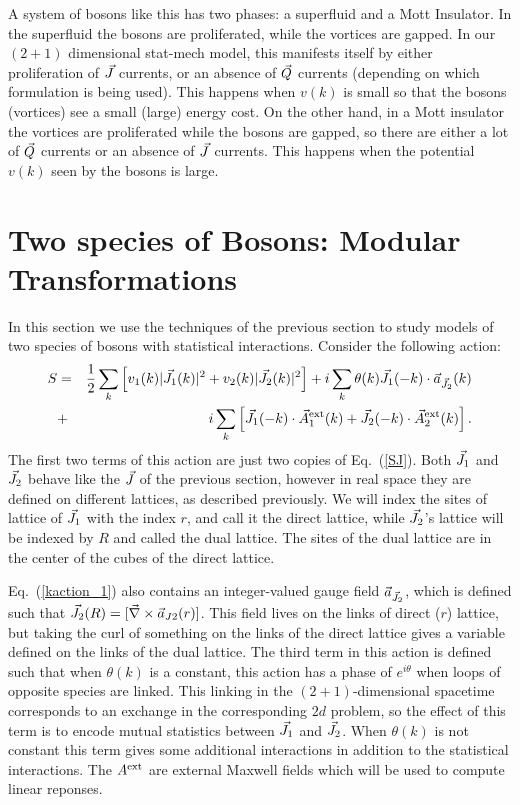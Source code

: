 A system of bosons like this has two phases: a superfluid and a Mott Insulator. In the superfluid the bosons are proliferated, while the vortices are gapped. In our $(2+1)$ dimensional stat-mech model, this manifests itself by either proliferation of $\vec{J}$ currents, or an absence of $\vec{Q}$ currents (depending on which formulation is being used). This happens when $v(k)$ is small so that the bosons (vortices) see a small (large) energy cost. On the other hand, in a Mott insulator the vortices are proliferated while the bosons are gapped, so there are either a lot of $\vec{Q}$ currents or an absence of $\vec{J}$ currents. This happens when the potential $v(k)$ seen by the bosons is large.

\section{Two species of Bosons: Modular Transformations}
\label{section::modular}
In this section we use the techniques of the previous section to study models of two species of bosons with statistical interactions.\cite{short_range3,Gen2Loops,FQHE} Consider the following action:
\begin{eqnarray}
S&=&\frac{1}{2}\sum_k \left[v_1(k)|\vec{J}_1(k)|^2+v_2(k)|\vec{J}_2(k)|^2\right]
+i\sum_k \theta(k)\vec{J}_1(-k)\cdot \vec{a}_{\vec{J}_2}(k)\nonumber\\
&+&i\sum_k \left[ \vec{J}_1(-k)\cdot \vec{A}_{1}^{\rm ext}(k) + \vec{J}_2(-k)\cdot \vec{A}_{2}^{\rm ext}(k) \right].
\label{kaction_1}
\end{eqnarray}
The first two terms of this action are just two copies of Eq.~(\ref{SJ}). Both $\vec{J}_1$ and $\vec{J}_2$ behave like the $\vec{J}$ of the previous section, however in real space they are defined on different lattices, as described previously. We will index the sites of lattice of $\vec{J}_1$ with the index $r$, and call it the direct lattice, while $\vec{J}_2$'s lattice will be indexed by $R$ and called the dual lattice. The sites of the dual lattice are in the center of the cubes of the direct lattice.

Eq.~(\ref{kaction_1}) also contains an integer-valued gauge field $\vec{a}_{\vec{J}_2}$, which is defined such that $\vec{J}_2(R)=[\vec{\nabla}\times\vec{a}_{J2}(r)]$. This field lives on the links of direct ($r$) lattice, but taking the curl of something on the links of the direct lattice gives a variable defined on the links of the dual lattice. The third term in this action is defined such that when $\theta(k)$ is a constant, this action has a phase of $e^{i\theta}$ when loops of opposite species are linked. This linking in the $(2+1)$-dimensional spacetime corresponds to an exchange in the corresponding $2d$ problem, so the effect of this term is to encode mutual statistics between $\vec{J}_1$ and $\vec{J}_2$. When $\theta(k)$ is not constant this term gives some additional interactions in addition to the statistical interactions. The $A^{\rm ext}$ are external Maxwell fields which will be used to compute linear reponses.


